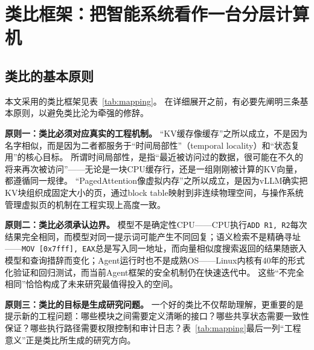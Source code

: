 \section{类比框架：把智能系统看作一台分层计算机}
\label{sec:framework}

\subsection{类比的基本原则}

本文采用的类比框架见表~\ref{tab:mapping}。
在详细展开之前，有必要先阐明三条基本原则，以避免类比沦为牵强的修辞。

\textbf{原则一：类比必须对应真实的工程机制。}
``KV缓存像缓存''之所以成立，不是因为名字相似，而是因为二者都服务于``时间局部性''（temporal locality）和``状态复用''的核心目标\cite{drepper2007memory,kwon2023pagedattention}。
所谓时间局部性，是指``最近被访问过的数据，很可能在不久的将来再次被访问''——无论是一块CPU缓存行，还是一组刚刚被计算的KV向量，都遵循同一规律。
``PagedAttention像虚拟内存''之所以成立，是因为vLLM确实把KV块组织成固定大小的页，通过block table映射到非连续物理空间，与操作系统管理虚拟页的机制在工程实现上高度一致\cite{kwon2023pagedattention}。

\textbf{原则二：类比必须承认边界。}
模型不是确定性CPU——CPU执行\texttt{ADD R1, R2}每次结果完全相同，而模型对同一提示词可能产生不同回复；语义检索不是精确寻址——\texttt{MOV [0x7fff], EAX}总是写入同一地址，而向量相似度搜索返回的结果随嵌入模型和查询措辞而变化；Agent运行时也不是成熟OS——Linux内核有40年的形式化验证和回归测试，而当前Agent框架的安全机制仍在快速迭代中。
这些``不完全相同''恰恰构成了未来研究最值得投入的空间。

\textbf{原则三：类比的目标是生成研究问题。}
一个好的类比不仅帮助理解，更重要的是提示新的工程问题：哪些模块之间需要定义清晰的接口？哪些共享状态需要一致性保证？哪些执行路径需要权限控制和审计日志？表~\ref{tab:mapping}最后一列``工程意义''正是类比所生成的研究方向。

